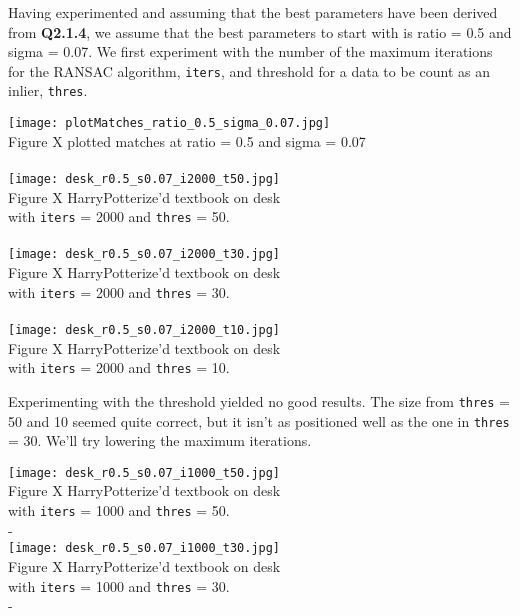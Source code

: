 \documentclass[12pt,letterpaper, onecolumn]{exam}
\begin{document}
\begin{questions}
    \begin{solution}
    Having experimented and assuming that the best parameters have been derived from \textbf{Q2.1.4}, we assume that the best parameters to start with is ratio = 0.5 and sigma = 0.07. We first experiment with the number of the maximum iterations for the RANSAC algorithm, \texttt{iters}, and threshold for a data to be count as an inlier, \texttt{thres}.
    \begin{center}
        \texttt{[image: plotMatches\_ratio\_0.5\_sigma\_0.07.jpg]}\\
        Figure X plotted matches at ratio = 0.5 and sigma = 0.07\\~\\
        \texttt{[image: desk\_r0.5\_s0.07\_i2000\_t50.jpg]}\\
        Figure X HarryPotterize'd textbook on desk \\ with \texttt{iters} = 2000 and \texttt{thres} = 50. \\~\\
        \texttt{[image: desk\_r0.5\_s0.07\_i2000\_t30.jpg]}\\
        Figure X HarryPotterize'd textbook on desk \\ with \texttt{iters} = 2000 and \texttt{thres} = 30. \\~\\
        \texttt{[image: desk\_r0.5\_s0.07\_i2000\_t10.jpg]}\\
        Figure X HarryPotterize'd textbook on desk \\ with \texttt{iters} = 2000 and \texttt{thres} = 10.
    \end{center}
    Experimenting with the threshold yielded no good results. The size from \texttt{thres} = 50 and 10 seemed quite correct, but it isn't as positioned well as the one in \texttt{thres} = 30. We'll try lowering the maximum iterations.
    \begin{center}
        \texttt{[image: desk\_r0.5\_s0.07\_i1000\_t50.jpg]}\\
        Figure X HarryPotterize'd textbook on desk \\ with \texttt{iters} = 1000 and \texttt{thres} = 50. \\-\\
        \texttt{[image: desk\_r0.5\_s0.07\_i1000\_t30.jpg]}\\
        Figure X HarryPotterize'd textbook on desk \\ with \texttt{iters} = 1000 and \texttt{thres} = 30. \\-\\

\end{center}
\end{solution}
\end{questions}
\end{document}
